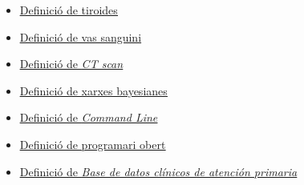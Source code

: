 \documentclass[a4paper,12pt]{article}
\begin{document}
\begin{itemize}
    \item \href{https://medlineplus.gov/spanish/thyroiddiseases.html#:~:text=La%20tiroides%20es%20una%20glándula,de%20sus%20funciones%20más%20importantes.}{\underline{Definició de tiroides}}
    \item \href{https://www.cancer.gov/espanol/publicaciones/diccionarios/diccionario-cancer/def/vaso-sanguineo}{\underline{Definició de vas sanguini}}
    \item \href{https://www.nhs.uk/conditions/ct-scan/}{\underline{Definició de \textit{CT scan}}}
    \item \href{https://vinculando.org/articulos/redes-bayesianas.html}{\underline{Definició de xarxes bayesianes}}
    \item \href{https://es.wikipedia.org/wiki/Interfaz_de_línea_de_comandos}{\underline{Definició de \textit{Command Line}}}
    \item \href{https://www.ibm.com/es-es/topics/open-source}{\underline{Definició de programari obert}}
    \item \href{https://www.sanidad.gob.es/estadEstudios/estadisticas/estadisticas/estMinisterio/SIAP/home.htm}{\underline{Definició de \textit{Base de datos clínicos de atención primaria}}}
\end{itemize}
\end{document}
